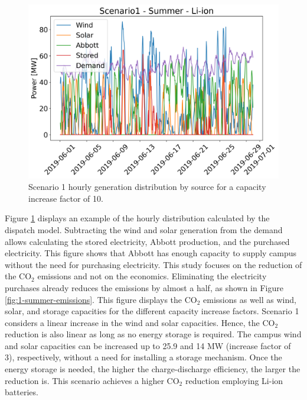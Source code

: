 \documentclass{anstrans}
\begin{document}
\begin{figure}[htbp!] %
    \centering
    \includegraphics[width=0.90\linewidth]{figures/scenario1-summerB}
    \hfill
    \caption{Scenario 1 hourly generation distribution by source for a capacity increase factor of 10.}
    \label{fig:1-summer-distrib}
\end{figure}

Figure \ref{fig:1-summer-distrib} displays an example of the hourly distribution calculated by the dispatch model.
Subtracting the wind and solar generation from the demand allows calculating the stored electricity, Abbott production, and the purchased electricity.
This figure shows that Abbott has enough capacity to supply campus without the need for purchasing electricity.
This study focuses on the reduction of the CO$_2$ emissions and not on the economics.
Eliminating the electricity purchases already reduces the emissions by almost a half, as shown in Figure \ref{fig:1-summer-emissions}.
This figure displays the CO$_2$ emissions as well as wind, solar, and storage capacities for the different capacity increase factors.
Scenario 1 considers a linear increase in the wind and solar capacities.
Hence, the CO$_2$ reduction is also linear as long as no energy storage is required.
The campus wind and solar capacities can be increased up to 25.9 and 14 MW (increase factor of 3), respectively, without a need for installing a storage mechanism.
Once the energy storage is needed, the higher the charge-discharge efficiency, the larger the reduction is.
This scenario achieves a higher CO$_2$ reduction employing Li-ion batteries.
\end{document}
